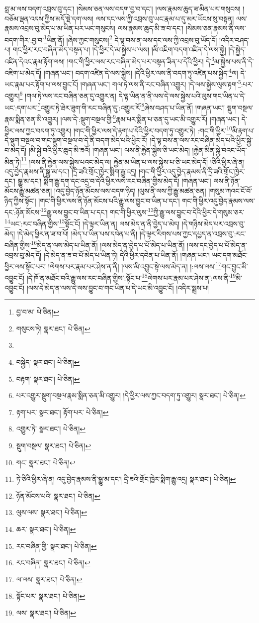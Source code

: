 བླ་མ་ལས་བདག་འབྲས་བུ་དང་། །སེམས་ཅན་ལས་བདག་བྱ་བ་དང་། །ལས་རྣམས་ཆུད་ཟ་མིན་པར་གསུངས། །བཅོམ་ལྡན་འདས་ཀྱིས་མདོ་སྡེ་དག་ལས། ལས་དང་ལས་ཀྱི་འབྲས་བུ་ཡང་རྣམ་པ་དུ་མར་ཡོངས་སུ་བསྟན། ལས་རྣམས་འབྲས་བུ་མེད་པ་མ་ཡིན་པར་ཡང་གསུངས། ལས་རྣམས་ཆུད་མི་ཟ་བ་དང་། །སེམས་ཅན་རྣམས་ནི་ལས་བདག་གིར་:བྱ་བ་\footnote{བྱ་བ་མ་  པེ་ཅིན། }ཡིན་ནོ། །ཞེས་ཀྱང་གསུངས།\footnote{གསུངས་ཏེ།  སྣར་ཐང་།  པེ་ཅིན། } དེ་ལྟ་བས་ན་ལས་དང་ལས་ཀྱི་འབྲས་བུ་ཡོད་དོ། །འདིར་བཤད་པ། གང་ཕྱིར་རང་བཞིན་མེད་བསྟན་པ། །དེ་ཕྱིར་དེ་མ་སྐྱེས་པ་ལས། །མི་འཇིག་བདག་འཛིན་དེ་ལས་སྐྱེ། །དེ་སྐྱེད་འཛིན་དེའང་རྣམ་རྟོག་ལས། །གང་གི་ཕྱིར་ལས་རང་བཞིན་མེད་པར་བསྟན་ཟིན་པ་དེའི་ཕྱིར། དེ་\footnote{}མ་སྐྱེས་པས་ནི་དེ་འཇིག་པ་མེད་དོ། །གཞན་ཡང་། བདག་འཛིན་དེ་ལས་སྐྱེས། །དེའི་ཕྱིར་ལས་ནི་བདག་ཏུ་འཛིན་པས་སྐྱེད་\footnote{བསྐྱེད་  སྣར་ཐང་།  པེ་ཅིན། }ལ། དེ་ཡང་རྣམ་པར་རྟོག་པ་ལས་བྱུང་ངོ། །གཞན་ཡང་། གལ་ཏེ་ལས་ནི་རང་བཞིན་འགྱུར། །དེ་ལས་སྐྱེས་ལུས་རྟག་\footnote{བརྟག་  སྣར་ཐང་།  པེ་ཅིན། }:པར་འགྱུར།\footnote{པར་འགྱུར་སྡུག་བསྔལ་རྣམ་སྨིན་ཅན་མི་འགྱུར། །དེ་ཕྱིར་ལས་ཀྱང་བདག་ཏུ་འགྱུར།  སྣར་ཐང་།  པེ་ཅིན། } །གལ་ཏེ་ལས་རང་བཞིན་ཅན་དུ་འགྱུར་ན། དེ་ལྟ་ཡིན་ན་ནི་ལས་དེ་ལས་སྐྱེས་པའི་ལུས་གང་ཡིན་པ་དེ་ཡང་:དག་པར་\footnote{རྟག་པར་  སྣར་ཐང་། རྟོག་པར་  པེ་ཅིན། }འགྱུར་ཏེ་ཐེར་ཟུག་གི་རང་བཞིན་དུ་:འགྱུར་རོ་\footnote{འགྱུར་ཏེ་  སྣར་ཐང་།  པེ་ཅིན། }ཞེས་བཤད་པ་ཡིན་ནོ། །གཞན་ཡང་། སྡུག་བསྔལ་རྣམ་སྨིན་ཅན་མི་འགྱུར། །ལས་དེ་:སྡུག་བསྔལ་གྱི་\footnote{སྡུག་བསྔལ་  སྣར་ཐང་།  པེ་ཅིན། }རྣམ་པར་སྨིན་པ་ཅན་དུ་ཡང་མི་འགྱུར་རོ། །གཞན་ཡང་། དེ་ཕྱིར་ལས་ཀྱང་བདག་ཏུ་འགྱུར། །གང་གི་ཕྱིར་ལས་དེ་རྟག་པ་དེའི་ཕྱིར་བདག་ཏུ་འགྱུར་ཏེ། :གང་གི་ཕྱིར་\footnote{གང་  སྣར་ཐང་།  པེ་ཅིན། }མི་རྟག་པ་དེ་སྡུག་བསྔལ་བ་གང་སྡུག་བསྔལ་བ་དེ་ནི་བདག་མེད་པའི་ཕྱིར་རོ། །དེ་ལྟ་བས་ན་ལས་རང་བཞིན་མེད་པའི་ཕྱིར་སྐྱེ་བ་མེད་དོ། །མི་སྐྱེ་བའི་ཕྱིར་ཆུད་མི་ཟའོ། །གཞན་ཡང་། ལས་ནི་རྐྱེན་སྐྱེས་ཅི་ཡང་མེད། །རྐྱེན་མིན་སྐྱེ་བའང་ཡོད་མིན་ཏེ།\footnote{ཏེ་ཅིའི་ཕྱིར་ཞེ་ན། འདུ་བྱེད་རྣམས་ནི་སྒྱུ་མ་དང་། དྲི་ཟའི་གྲོང་ཁྱེར་སྨིག་རྒྱུ་འདྲ།  སྣར་ཐང་།  པེ་ཅིན། } །ལས་ནི་རྐྱེན་ལས་སྐྱེས་པའང་མེད་ལ། རྐྱེན་མ་ཡིན་པ་ལས་སྐྱེས་པ་ཅི་ཡང་མེད་དོ། །ཅིའི་ཕྱིར་ཞེ་ན། འདུ་བྱེད་རྣམས་ནི་སྒྱུ་མ་དང་། །དྲི་ཟའི་གྲོང་ཁྱེར་སྨིག་རྒྱུ་འདྲ། །གང་གི་ཕྱིར་འདུ་བྱེད་རྣམས་ནི་དྲི་ཟའི་གྲོང་ཁྱེར་དང་། སྒྱུ་མ་དང་། སྨིག་རྒྱུ་དག་དང་འདྲ་བ་དེའི་ཕྱིར་ལས་རང་བཞིན་གྱིས་མེད་དོ། །གཞན་ཡང་། ལས་ནི་ཉོན་མོངས་རྒྱུ་མཚན་ཅན། །འདུ་བྱེད་ཉོན་མོངས་ལས་བདག་ཉིད། །ལུས་ནི་ལས་ཀྱི་རྒྱུ་མཚན་ཅན། །གསུམ་ཀའང་ངོ་བོ་ཉིད་ཀྱིས་སྟོང་། །གང་གི་ཕྱིར་ལས་ནི་ཉོན་མོངས་པའི་རྒྱུ་ལས་བྱུང་བ་ཡིན་པ་དང་། གང་གི་ཕྱིར་འདུ་བྱེད་རྣམས་ལས་དང་:ཉོན་མོངས་\footnote{ཉོན་མོངས་པའི་  སྣར་ཐང་།  པེ་ཅིན། }རྒྱུ་ལས་བྱུང་བ་ཡིན་པ་དང་། གང་གི་ཕྱིར་ལུས་\footnote{ལུས་ལས་  སྣར་ཐང་།  པེ་ཅིན། }ཀྱི་རྒྱུ་ལས་བྱུང་བ་དེའི་ཕྱིར་དེ་གསུམ་ཅར་\footnote{ཆར་  སྣར་ཐང་།  པེ་ཅིན། }ཡང་:རང་བཞིན་གྱིས་\footnote{རང་བཞིན་གྱི་  སྣར་ཐང་།  པེ་ཅིན། }སྟོང་ངོ། །དེ་ལྟར་ཡིན་ན། ལས་མེད་ན་ནི་བྱེད་པ་མེད། །དེ་གཉིས་མེད་པར་འབྲས་བུ་མེད། །དེ་མེད་ཕྱིར་ན་ཟ་བ་པོ། །མེད་པ་ཡིན་པས་དབེན་པ་ནི། །དེ་ལྟར་རིགས་པས་ཀྱང་དཔྱད་ན་འབྲས་བུ་:རང་བཞིན་གྱིས་\footnote{རང་བཞིན་  སྣར་ཐང་།  པེ་ཅིན། }མེད་ན་ལས་མེད་པ་ཡིན་ནོ། །ལས་མེད་ན་བྱེད་པ་པོ་མེད་པ་ཡིན་ནོ། །ལས་དང་བྱེད་པ་པོ་མེད་ན་འབྲས་བུ་མེད་དོ། །དེ་མེད་ན་ཟ་བ་པོ་མེད་པ་ཡིན་ཏེ། དེའི་ཕྱིར་དབེན་པ་ཡིན་ནོ། །གཞན་ཡང་། ཡང་དག་མཐོང་ཕྱིར་ལས་སྟོང་པར། །ལེགས་པར་རྣམ་པར་ཤེས་ན་ནི། །ལས་མི་འབྱུང་སྟེ་ལས་མེད་ན། །:ལས་ལས་\footnote{ལ་ལས་  སྣར་ཐང་།  པེ་ཅིན། }གང་བྱུང་མི་འབྱུང་ངོ། །དེ་ཁོ་ན་མཐོང་བའི་རྒྱུ་ལས་རང་བཞིན་གྱིས་:སྟོང་པ་\footnote{སྟོང་པར་  སྣར་ཐང་།  པེ་ཅིན། }ལེགས་པར་རྣམ་པར་ཤེས་ན་:ལས་ནི་\footnote{ལས་  སྣར་ཐང་།  པེ་ཅིན། }མི་འབྱུང་ངོ། །ལས་དེ་མེད་ན་ལས་དེ་ལས་བྱུང་བ་གང་ཡིན་པ་དེ་ཡང་མི་འབྱུང་ངོ། །འདིར་སྨྲས་པ། 